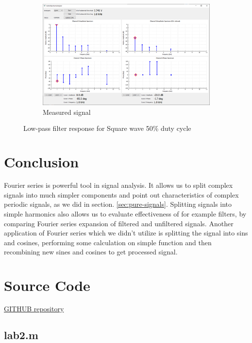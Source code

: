 \documentclass[notitlepage, a4paper, 11pt]{article}
\begin{document}
\begin{figure}[H]
\begin{subfigure}[][][t]{0.45\textwidth}
			\includegraphics[width=\textwidth, trim=10 80 10 100, clip]{../img/Circuit2/trig40}
			\caption{Measured signal}
		\end{subfigure}
		\caption{Low-pass filter response for Square wave 50\% duty cycle}
	\end{figure}
	
	\section{Conclusion}
	
	Fourier series is powerful tool in signal analysis. It allows us to split  complex signals into much simpler components and point out characteristics of complex periodic signals, as we did in section. \ref{sec:pure-signals}. Splitting signals into simple harmonics also allows us to evaluate effectiveness of for example filters, by comparing Fourier series expansion of filtered and unfiltered signals. Another application of Fourier series which we didn't utilize is splitting the signal into sins and cosines, performing some calculation on simple function and then recombining new sines and cosines to get processed signal. %
	
	\newpage
	\appendix
	\section{Source Code}\label{sec:source-code}
	\href{https://github.com/kamilix2003/CT_labs}{GITHUB repository}
	\subsection*{lab2.m}
	\inputminted{matlab}{../Matlab/lab2.m}
\end{document}
